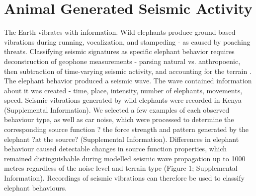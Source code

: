 \documentclass[a4paper, 11pt]{article}
\begin{document}
   \section{Animal Generated Seismic Activity}
The Earth vibrates with information. Wild elephants produce ground-based vibrations during running, vocalization, and stampeding - as caused by poaching threats. Classifying seismic signatures as specific elephant behavior requires deconstruction of geophone measurements - parsing natural vs. anthropoenic, then subtraction of time-varying seismic activity, and accounting for the terrain \cite{mortimer2018classifying}. The elephant behavior produced a seismic wave. The wave contained information about it was created - time, place, intensity, number of elephants, movements, speed.   
Seismic vibrations generated by wild elephants were recorded in Kenya (Supplemental Information). We selected a few examples of each observed behaviour type, as well as car noise, which were processed to determine the corresponding source function ? the force strength and pattern generated by the elephant ?at the source? (Supplemental Information). Differences in elephant behaviour caused detectable changes in source function properties, which remained distinguishable during modelled seismic wave propagation up to 1000 metres regardless of the noise level and terrain type (Figure 1; Supplemental Information). Recordings of seismic vibrations can therefore be used to classify elephant behaviours.



      
    
\end{document}
